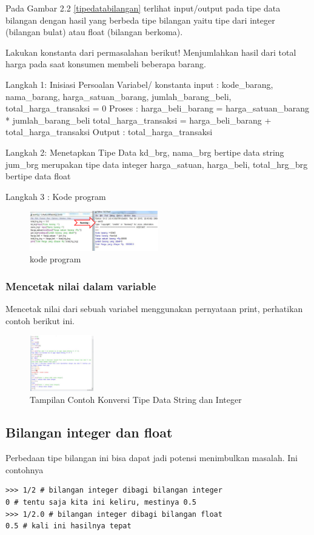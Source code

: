 Pada Gambar 2.2 \ref{tipedatabilangan} terlihat input/output pada tipe data bilangan dengan hasil yang berbeda tipe bilangan yaitu tipe dari integer (bilangan bulat) atau float (bilangan berkoma).\cite{irfani2016bahan}

Lakukan konstanta dari permasalahan berikut! Menjumlahkan hasil dari total harga pada saat konsumen membeli beberapa barang.

Langkah 1: Inisiasi Persoalan 
Variabel/ konstanta input :  
kode_barang, nama_barang, harga_satuan_barang, 
jumlah_barang_beli, total_harga_transaksi = 0 
Proses :  harga_beli_barang = harga_satuan_barang * jumlah_barang_beli 
total_harga_transaksi = harga_beli_barang + total_harga_transaksi
Output :  total_harga_transaksi

Langkah 2: Menetapkan Tipe Data 
kd_brg, nama_brg bertipe data string 
jum_brg merupakan tipe data integer harga_satuan, harga_beli, total_hrg_brg bertipe data float 

Langkah 3 : Kode program
\begin{figure}[ht]
    \centerline{\includegraphics[width=0.50\textwidth]{figures/code.png}}
    \caption{kode program}
    \label{code}
    \end{figure}
  
\subsubsection{Mencetak nilai dalam variable} 
Mencetak nilai dari sebuah variabel menggunakan pernyataan print, perhatikan 
contoh berikut ini. 
\begin{figure}[ht]
    \centerline{\includegraphics[width=0.25\textwidth]{figures/konversi.png}}
    \caption{Tampilan Contoh Konversi Tipe Data String dan Integer}
    \label{Tipe Data String dan Integer}
    \end{figure}

\subsection{Bilangan integer dan float}
Perbedaan tipe bilangan ini bisa dapat jadi potensi menimbulkan masalah. 
Ini contohnya
\begin{verbatim}
>>> 1/2 # bilangan integer dibagi bilangan integer
0 # tentu saja kita ini keliru, mestinya 0.5
>>> 1/2.0 # bilangan integer dibagi bilangan float
0.5 # kali ini hasilnya tepat
\end{verbatim}

